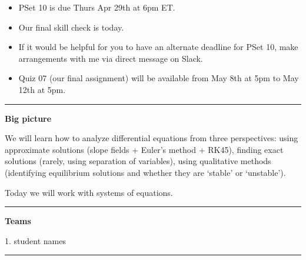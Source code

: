 \documentclass[12pt,letterpaper,noanswers]{exam}
\begin{document}
 \pdfpageheight 11in 
  \pdfpagewidth 8.5in





\begin{itemize}
\itemsep0em
\item PSet 10 is due Thurs Apr 29th at 6pm ET.
\item Our final skill check is today.
\item If it would be helpful for you to have an alternate deadline for PSet 10, make arrangements with me via direct message on Slack.
\item Quiz 07 (our final assignment) will be available from May 8th at 5pm to May 12th at 5pm.
\end{itemize}

\hrule
\vspace{0.2cm}


\noindent\textbf{Big picture}

We will learn how to analyze differential equations from three perspectives: using approximate solutions (slope fields + Euler's method + RK45), finding exact solutions (rarely, using separation of variables), using qualitative methods (identifying equilibrium solutions and whether they are `stable' or `unstable').

Today we will work with systems of equations.


\vspace{0.2cm}
\hrule
\vspace{0.2cm}

\noindent\textbf{Teams}

\begin{multicols}{2}

1.  student names
\end{multicols}


\vspace{0.2cm}
\hrule
\vspace{0.2cm}
\end{document}
